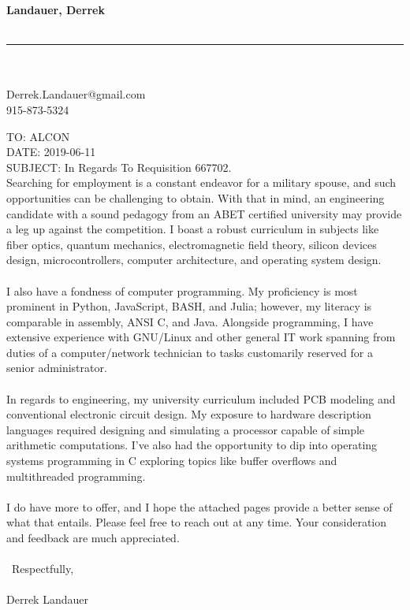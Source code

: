 \makeatletter
\def\vhrulefill#1{\leavevmode\leaders\hrule\@height#1\hfill \kern\z@}
\makeatother

\begin{center}\begin{minipage}[c]{0,75\textwidth}
    \begin{flushright}%
      {\large \textbf{Landauer, Derrek}}              \\
      ~\\[-24pt]
      \hspace{1.5in}\vhrulefill{1pt} \\
      ~\\[-12pt]
    {\footnotesize
    Derrek.Landauer@gmail.com      \\
    915-873-5324}
\end{flushright}

TO: ALCON\\
DATE: 2019-06-11\\
SUBJECT: In Regards To Requisition 667702.\\[36pt]
\small
Searching for employment is a constant endeavor for a military spouse, and such opportunities can be challenging to obtain. With that in mind, an engineering candidate with a sound pedagogy from an ABET certified university may provide a leg up against the competition. I boast a robust curriculum in subjects like fiber optics, quantum mechanics, electromagnetic field theory, silicon devices design, microcontrollers, computer architecture, and operating system design.
\\\\
I also have a fondness of computer programming. My proficiency is most prominent in Python, JavaScript, BASH, and Julia; however, my literacy is comparable in assembly, ANSI C, and Java. Alongside programming, I have extensive experience with GNU/Linux and other general IT work spanning from duties of a computer/network technician to tasks customarily reserved for a senior administrator.
\\\\
In regards to engineering, my university curriculum included PCB modeling and conventional electronic circuit design. My exposure to hardware description languages required designing and simulating a processor capable of simple arithmetic computations. I've also had the opportunity to dip into operating systems programming in C exploring topics like buffer overflows and multithreaded programming.
\\\\
I do have more to offer, and I hope the attached pages provide a better sense of what that entails. Please feel free to reach out at any time. Your consideration and feedback are much appreciated.
\\\\\
    Respectfully,
\\\\
        Derrek Landauer
\end{minipage}\end{center}
